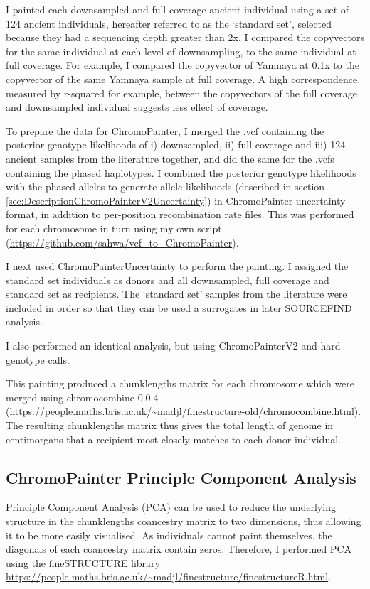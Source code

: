 {I painted each downsampled and full coverage ancient individual using a set of 124 ancient individuals, hereafter referred to as the `standard set', selected because they had a sequencing depth greater than 2x. I compared the copyvectors for the same individual at each level of downsampling, to the same individual at full coverage. For example, I compared the copyvector of Yamnaya at 0.1x to the copyvector of the same Yamnaya sample at full coverage. A high correspondence, measured by r-squared for example, between the copyvectors of the full coverage and downsampled individual suggests less effect of coverage. 

To prepare the data for ChromoPainter, I merged the .vcf containing the posterior genotype likelihoods of i) downsampled, ii) full coverage and iii) 124 ancient samples from the literature together, and did the same for the .vcfs containing the phased haplotypes.  I combined the posterior genotype likelihoods with the phased alleles to generate allele likelihoods (described in section \ref{sec:DescriptionChromoPainterV2Uncertainty}) in ChromoPainter-uncertainty format, in addition to per-position recombination rate files. This was performed for each chromosome in turn using my own script (\url{https://github.com/sahwa/vcf_to_ChromoPainter}).

I next used ChromoPainterUncertainty to perform the painting. I assigned the standard set individuals as donors and all downsampled, full coverage and standard set as recipients. The `standard set' samples from the literature were included in order so that they can be used a surrogates in later SOURCEFIND analysis.

I also performed an identical analysis, but using ChromoPainterV2 and hard genotype calls. 

This painting produced a chunklengths matrix for each chromosome which were merged using chromocombine-0.0.4 (\url{https://people.maths.bris.ac.uk/~madjl/finestructure-old/chromocombine.html}). The resulting chunklengths matrix thus gives the total length of genome in centimorgans that a recipient most closely matches to each donor individual. 

\subsection{ChromoPainter Principle Component Analysis}

Principle Component Analysis (PCA) can be used to reduce the underlying structure in the chunklengths coancestry matrix to two dimensions, thus allowing it to be more easily visualised. As individuals cannot paint themselves, the diagonals of each coancestry matrix contain zeros. Therefore, I performed PCA using the fineSTRUCTURE library \url{https://people.maths.bris.ac.uk/~madjl/finestructure/finestructureR.html}.

}
